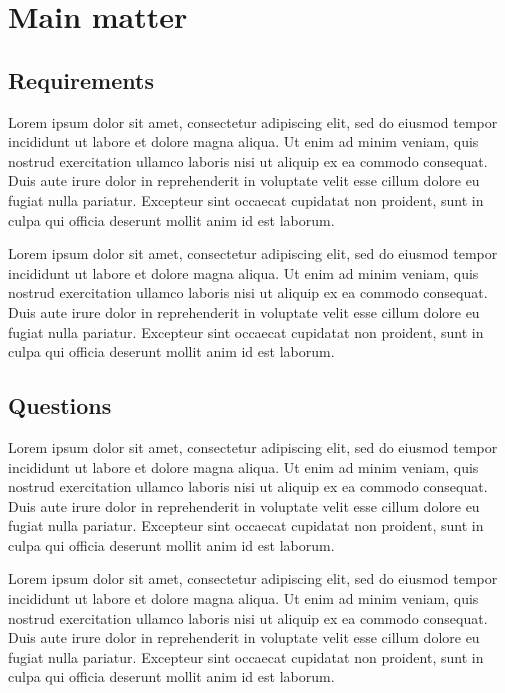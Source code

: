 \section{Main matter}

\subsection{Requirements}
Lorem ipsum dolor sit amet, consectetur adipiscing elit, sed do eiusmod tempor incididunt ut labore et dolore magna aliqua. Ut enim ad minim veniam, quis nostrud exercitation ullamco laboris nisi ut aliquip ex ea commodo consequat. Duis aute irure dolor in reprehenderit in voluptate velit esse cillum dolore eu fugiat nulla pariatur. Excepteur sint occaecat cupidatat non proident, sunt in culpa qui officia deserunt mollit anim id est laborum.

Lorem ipsum dolor sit amet, consectetur adipiscing elit, sed do eiusmod tempor incididunt ut labore et dolore magna aliqua. Ut enim ad minim veniam, quis nostrud exercitation ullamco laboris nisi ut aliquip ex ea commodo consequat. Duis aute irure dolor in reprehenderit in voluptate velit esse cillum dolore eu fugiat nulla pariatur. Excepteur sint occaecat cupidatat non proident, sunt in culpa qui officia deserunt mollit anim id est laborum.


\subsection{Questions}

Lorem ipsum dolor sit amet, consectetur adipiscing elit, sed do eiusmod tempor incididunt ut labore et dolore magna aliqua. Ut enim ad minim veniam, quis nostrud exercitation ullamco laboris nisi ut aliquip ex ea commodo consequat. Duis aute irure dolor in reprehenderit in voluptate velit esse cillum dolore eu fugiat nulla pariatur. Excepteur sint occaecat cupidatat non proident, sunt in culpa qui officia deserunt mollit anim id est laborum.

Lorem ipsum dolor sit amet, consectetur adipiscing elit, sed do eiusmod tempor incididunt ut labore et dolore magna aliqua. Ut enim ad minim veniam, quis nostrud exercitation ullamco laboris nisi ut aliquip ex ea commodo consequat. Duis aute irure dolor in reprehenderit in voluptate velit esse cillum dolore eu fugiat nulla pariatur. Excepteur sint occaecat cupidatat non proident, sunt in culpa qui officia deserunt mollit anim id est laborum.

